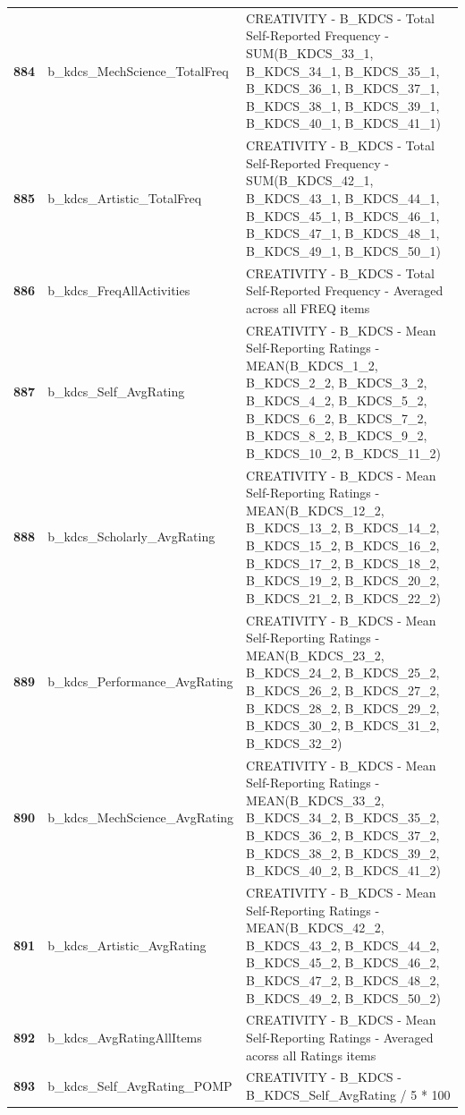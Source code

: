 \documentclass[
  letterpaper,
  DIV=11,
  numbers=noendperiod]{scrartcl}
\begin{document}
\begin{longtable}[t]{>{}cll}
\textbf{884} & b\_kdcs\_MechScience\_TotalFreq & CREATIVITY - B\_KDCS - Total Self-Reported Frequency - SUM(B\_KDCS\_33\_1, B\_KDCS\_34\_1, B\_KDCS\_35\_1, B\_KDCS\_36\_1, B\_KDCS\_37\_1, B\_KDCS\_38\_1, B\_KDCS\_39\_1, B\_KDCS\_40\_1, B\_KDCS\_41\_1)\\
\textbf{885} & b\_kdcs\_Artistic\_TotalFreq & CREATIVITY - B\_KDCS - Total Self-Reported Frequency - SUM(B\_KDCS\_42\_1, B\_KDCS\_43\_1, B\_KDCS\_44\_1, B\_KDCS\_45\_1, B\_KDCS\_46\_1, B\_KDCS\_47\_1, B\_KDCS\_48\_1, B\_KDCS\_49\_1, B\_KDCS\_50\_1)\\
\addlinespace
\textbf{886} & b\_kdcs\_FreqAllActivities & CREATIVITY - B\_KDCS - Total Self-Reported Frequency - Averaged across all FREQ items\\
\textbf{887} & b\_kdcs\_Self\_AvgRating & CREATIVITY - B\_KDCS - Mean Self-Reporting Ratings - MEAN(B\_KDCS\_1\_2, B\_KDCS\_2\_2, B\_KDCS\_3\_2, B\_KDCS\_4\_2, B\_KDCS\_5\_2, B\_KDCS\_6\_2, B\_KDCS\_7\_2, B\_KDCS\_8\_2, B\_KDCS\_9\_2, B\_KDCS\_10\_2, B\_KDCS\_11\_2)\\
\textbf{888} & b\_kdcs\_Scholarly\_AvgRating & CREATIVITY - B\_KDCS - Mean Self-Reporting Ratings - MEAN(B\_KDCS\_12\_2, B\_KDCS\_13\_2, B\_KDCS\_14\_2, B\_KDCS\_15\_2, B\_KDCS\_16\_2, B\_KDCS\_17\_2, B\_KDCS\_18\_2, B\_KDCS\_19\_2, B\_KDCS\_20\_2, B\_KDCS\_21\_2, B\_KDCS\_22\_2)\\
\textbf{889} & b\_kdcs\_Performance\_AvgRating & CREATIVITY - B\_KDCS - Mean Self-Reporting Ratings - MEAN(B\_KDCS\_23\_2, B\_KDCS\_24\_2, B\_KDCS\_25\_2, B\_KDCS\_26\_2, B\_KDCS\_27\_2, B\_KDCS\_28\_2, B\_KDCS\_29\_2, B\_KDCS\_30\_2, B\_KDCS\_31\_2, B\_KDCS\_32\_2)\\
\textbf{890} & b\_kdcs\_MechScience\_AvgRating & CREATIVITY - B\_KDCS - Mean Self-Reporting Ratings - MEAN(B\_KDCS\_33\_2, B\_KDCS\_34\_2, B\_KDCS\_35\_2, B\_KDCS\_36\_2, B\_KDCS\_37\_2, B\_KDCS\_38\_2, B\_KDCS\_39\_2, B\_KDCS\_40\_2, B\_KDCS\_41\_2)\\
\addlinespace
\textbf{891} & b\_kdcs\_Artistic\_AvgRating & CREATIVITY - B\_KDCS - Mean Self-Reporting Ratings - MEAN(B\_KDCS\_42\_2, B\_KDCS\_43\_2, B\_KDCS\_44\_2, B\_KDCS\_45\_2, B\_KDCS\_46\_2, B\_KDCS\_47\_2, B\_KDCS\_48\_2, B\_KDCS\_49\_2, B\_KDCS\_50\_2)\\
\textbf{892} & b\_kdcs\_AvgRatingAllItems & CREATIVITY - B\_KDCS - Mean Self-Reporting Ratings - Averaged acorss all Ratings items\\
\textbf{893} & b\_kdcs\_Self\_AvgRating\_POMP & CREATIVITY - B\_KDCS - B\_KDCS\_Self\_AvgRating / 5 * 100\\

\end{longtable}
\end{document}
